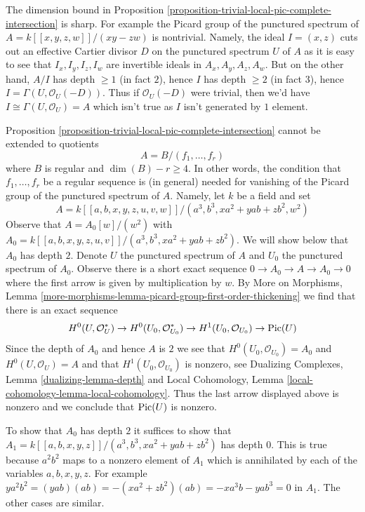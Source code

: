 \begin{example}
\label{example-grothendieck-sharp}
The dimension bound in
Proposition \ref{proposition-trivial-local-pic-complete-intersection}
is sharp. For example the Picard group of the punctured spectrum of
$A = k[[x, y, z, w]]/(xy - zw)$ is nontrivial. Namely, the
ideal $I = (x, z)$ cuts out an effective Cartier divisor $D$ on the punctured
spectrum $U$ of $A$ as it is easy to see that $I_x, I_y, I_z, I_w$
are invertible ideals in $A_x, A_y, A_z, A_w$. But on the other hand,
$A/I$ has depth $\geq 1$ (in fact $2$), hence $I$ has depth $\geq 2$
(in fact $3$), hence
$I = \Gamma(U, \mathcal{O}_U(-D))$. Thus if $\mathcal{O}_U(-D)$
were trivial, then we'd have $I \cong \Gamma(U, \mathcal{O}_U) = A$
which isn't true as $I$ isn't generated by $1$ element.
\end{example}

\begin{example}
\label{example-grothendieck-sharp-bis}
Proposition \ref{proposition-trivial-local-pic-complete-intersection}
cannot be extended to quotients
$$
A = B/(f_1, \ldots, f_r)
$$
where $B$ is regular and $\dim(B) - r \geq 4$. In other words, the condition
that $f_1, \ldots, f_r$ be a regular sequence is (in general) needed
for vanishing of the Picard group of the punctured spectrum of $A$.
Namely, let $k$ be a field and set
$$
A = k[[a, b, x, y, z, u, v, w]]/(a^3, b^3, xa^2 + yab + zb^2, w^2)
$$
Observe that $A = A_0[w]/(w^2)$ with
$A_0 = k[[a, b, x, y, z, u, v]]/(a^3, b^3, xa^2 + yab + zb^2)$.
We will show below that $A_0$ has depth $2$.
Denote $U$ the punctured spectrum of $A$ and $U_0$ the punctured
spectrum of $A_0$. Observe there is a short exact sequence
$0 \to A_0 \to A \to A_0 \to 0$ where the first arrow is
given by multiplication by $w$.
By More on Morphisms, Lemma
\ref{more-morphisms-lemma-picard-group-first-order-thickening}
we find that there is an exact sequence
$$
H^0(U, \mathcal{O}_U^*) \to
H^0(U_0, \mathcal{O}_{U_0}^*) \to
H^1(U_0, \mathcal{O}_{U_0}) \to
\mathop{\mathrm{Pic}}\nolimits(U)
$$
Since the depth of $A_0$ and hence $A$ is $2$ we see that
$H^0(U_0, \mathcal{O}_{U_0}) = A_0$ and $H^0(U, \mathcal{O}_U) = A$
and that $H^1(U_0, \mathcal{O}_{U_0})$ is nonzero, see
Dualizing Complexes, Lemma \ref{dualizing-lemma-depth} and
Local Cohomology, Lemma \ref{local-cohomology-lemma-local-cohomology}.
Thus the last arrow displayed above is nonzero and we conclude
that $\mathop{\mathrm{Pic}}\nolimits(U)$ is nonzero.

\medskip\noindent
To show that $A_0$ has depth $2$ it suffices to show that
$A_1 = k[[a, b, x, y, z]]/(a^3, b^3, xa^2 + yab + zb^2)$
has depth $0$. This is true because $a^2b^2$ maps to
a nonzero element of $A_1$ which is annihilated
by each of the variables $a, b, x, y, z$. For example
$ya^2b^2 = (yab)(ab) = - (xa^2 + zb^2)(ab) = -xa^3b - yab^3 = 0$ in $A_1$.
The other cases are similar.
\end{example}










